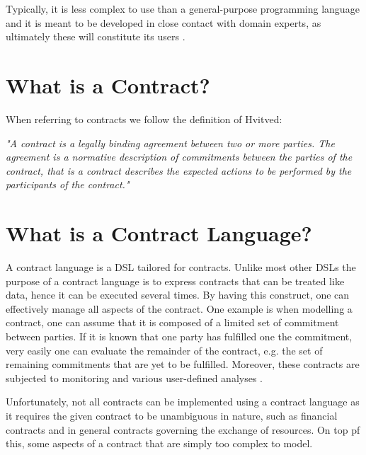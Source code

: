 \documentclass{ituthesis}
\begin{document}
Typically, it is less complex to use than a general-purpose programming language and it is meant to be developed in close contact with domain experts, as ultimately these will constitute its users \cite{dsl}.

\section{What is a Contract?}

When referring to contracts we follow the definition of Hvitved:
\begin{displayquote}
\textit{"A contract is a legally binding agreement between two or more parties. The agreement is a normative description of commitments between the parties of the contract, that is a contract describes the expected actions to be performed by the participants of the contract."}
\cite{hvitved2011contract}
\end{displayquote}

\section{What is a Contract Language?}
A contract language is a DSL tailored for contracts. Unlike most other DSLs the purpose of a contract language is to express contracts that can be treated like data, hence it can be executed several times. By having this construct, one can effectively manage all aspects of the contract. One example is when modelling a contract, one can assume that it is composed of a limited set of commitment between parties. If it is known that one party has fulfilled one the commitment, very easily one can evaluate the remainder of the contract, e.g. the set of remaining commitments that are yet to be fulfilled. Moreover, these contracts are subjected to monitoring and various user-defined analyses \cite{andersen2006compositional}.

Unfortunately, not all contracts can be implemented using a contract language as it requires the given contract to be unambiguous in nature, such as financial contracts and in general contracts governing the exchange of resources. On top pf this, some aspects of a contract that are simply too complex to model. %

\end{document}
